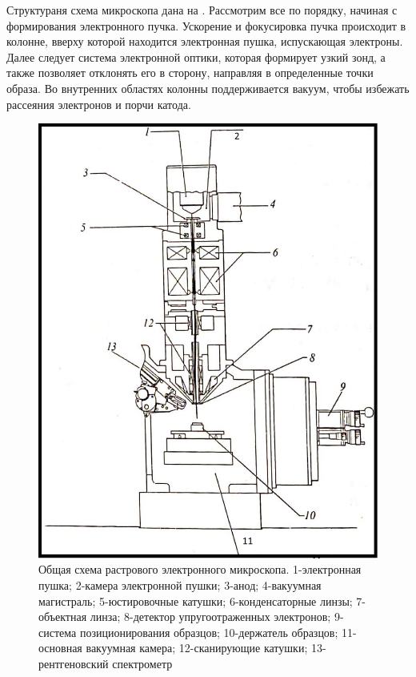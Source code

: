 \documentclass[a4paper,12pt]{article}
\theoremstyle{plain} %
\theoremstyle{definition} %
\theoremstyle{remark} %
\newcommand{\picref}[1]{
	\text{рис(\ref{#1})}
}
\begin{document}
	Структураня схема микроскопа дана на \picref{pic1}. Рассмотрим все по порядку, начиная с формирования электронного пучка. Ускорение и фокусировка пучка происходит в колонне, вверху которой находится электронная пушка, испускающая электроны. Далее следует система электронной оптики, которая формирует узкий зонд, а также позволяет отклонять его в сторону, направляя в определенные точки образа. Во внутренних областях колонны поддерживается вакуум, чтобы избежать рассеяния электронов и порчи катода.
	\begin{figure}[h!]
		\centering
		\includegraphics[scale=0.3]{pic1.jpg}
		\caption{Общая схема растрового электронного микроскопа. 1-электронная пушка; 2-камера электронной пушки; 3-анод; 4-вакуумная магистраль; 5-юстировочные катушки; 6-конденсаторные линзы; 7-объектная линза; 8-детектор упругоотраженных электронов; 9-система позиционирования образцов; 10-держатель образцов; 11-основная вакуумная камера; 12-сканирующие катушки; 13-рентгеновский спектрометр}
		\label{pic1}
	\end{figure}
\end{document}
